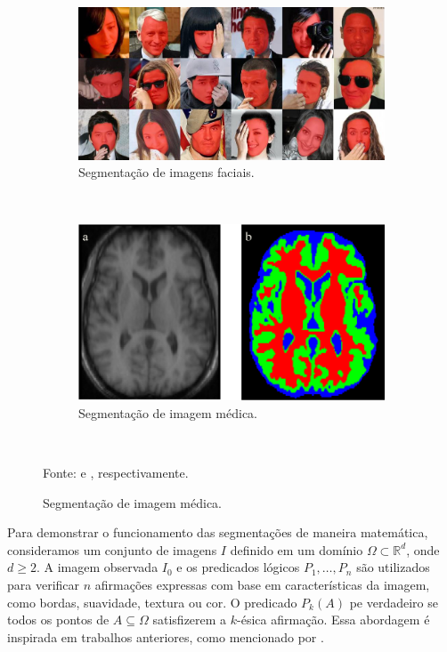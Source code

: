 \begin{figure}[H]
   \caption{Exemplos de segmentações de imagens.}
   \centering
   \label{segment:fig:1}
    \begin{subfigure}[t]{0.6\textwidth}
        \centering
        \includegraphics[width=1\linewidth]{recursos/imagens/image_seg/faces.png}
        \caption{Segmentação de imagens faciais.}
        \label{segment:fig:1.1}
    \end{subfigure}%
    ~ 

    \begin{subfigure}[t]{0.6\textwidth}
        \centering
        \includegraphics[width=1\linewidth]{recursos/imagens/image_seg/cerebro.png}
        \caption{Segmentação de imagem médica.}
        \label{segment:fig:1.2}
    \end{subfigure}%
    ~

    Fonte: \cite{Nirkin2018} e \cite{Withey2008}, respectivamente.
\end{figure}

Para demonstrar o funcionamento das segmentações de maneira matemática, consideramos um conjunto de imagens $I$ definido em um domínio $\Omega \subset \mathbb{R}^d$, onde $d \geq 2$. A imagem observada $I_0$ e os predicados lógicos $P_1, \ldots, P_n$ são utilizados para verificar $n$ afirmações expressas com base em características da imagem, como bordas, suavidade, textura ou cor. O predicado $P_k(A)$ pe verdadeiro se todos os pontos de $A \subseteq \Omega$ satisfizerem a $k$-ésica afirmação. Essa abordagem é inspirada em trabalhos anteriores, como mencionado por \cite{antonelli2022view}.

